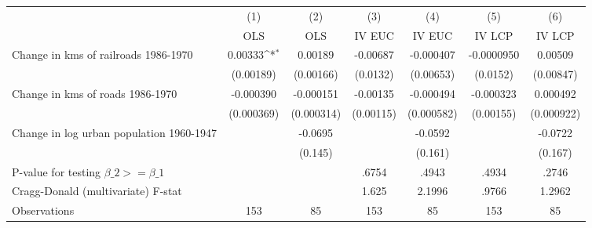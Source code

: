 {
\def\sym#1{\ifmmode^{#1}\else\(^{#1}\)\fi}
\begin{tabular}{l*{6}{c}}
\hline\hline
                &\multicolumn{1}{c}{(1)}&\multicolumn{1}{c}{(2)}&\multicolumn{1}{c}{(3)}&\multicolumn{1}{c}{(4)}&\multicolumn{1}{c}{(5)}&\multicolumn{1}{c}{(6)}\\
                &\multicolumn{1}{c}{OLS}&\multicolumn{1}{c}{OLS}&\multicolumn{1}{c}{IV EUC}&\multicolumn{1}{c}{IV EUC}&\multicolumn{1}{c}{IV LCP}&\multicolumn{1}{c}{IV LCP}\\
\hline
Change in kms of railroads 1986-1970&  0.00333\sym{*}  &  0.00189         & -0.00687         &-0.000407         &-0.0000950         &  0.00509         \\
                &(0.00189)         &(0.00166)         & (0.0132)         &(0.00653)         & (0.0152)         &(0.00847)         \\
[1em]
Change in kms of roads 1986-1970&-0.000390         &-0.000151         & -0.00135         &-0.000494         &-0.000323         & 0.000492         \\
                &(0.000369)         &(0.000314)         &(0.00115)         &(0.000582)         &(0.00155)         &(0.000922)         \\
[1em]
Change in log urban population 1960-1947&                  &  -0.0695         &                  &  -0.0592         &                  &  -0.0722         \\
                &                  &  (0.145)         &                  &  (0.161)         &                  &  (0.167)         \\
\hline
P-value for testing $\beta\_{2} >= \beta\_{1}$&                  &                  &    .6754         &    .4943         &    .4934         &    .2746         \\
Cragg-Donald (multivariate) F-stat&                  &                  &    1.625         &   2.1996         &    .9766         &   1.2962         \\
Observations    &      153         &       85         &      153         &       85         &      153         &       85         \\
\hline\hline
\end{tabular}
}
